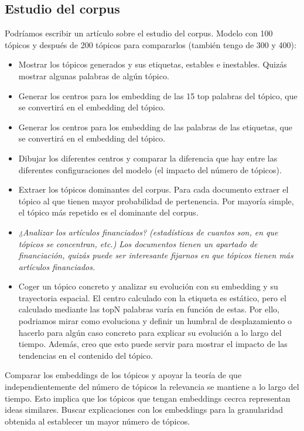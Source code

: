 \documentclass[a4paper,10pt]{article}
\begin{document}
\subsection{Estudio del corpus}
Podríamos escribir un artículo sobre el estudio del corpus. Modelo con 100 tópicos y después de 200 tópicos para compararlos (también tengo de 300 y 400):
\begin{itemize}
	\item Mostrar los tópicos generados y sus etiquetas, estables e inestables. Quizás mostrar algunas palabras de algún tópico. 
	\item Generar los centros para los embedding de las 15 top palabras del tópico, que se convertirá en el embedding del tópico.
	\item Generar los centros para los embedding de las palabras de las etiquetas, que se convertirá en el embedding del tópico.
	\item Dibujar los diferentes centros y comparar la diferencia que hay entre las diferentes configuraciones del modelo (el impacto del número de tópicos).
	\item Extraer los tópicos dominantes del corpus. Para cada documento extraer el tópico al que tienen mayor probabilidad de pertenencia. Por mayoría simple, el tópico más repetido es el dominante del corpus.
	\item \textit{¿Analizar los artículos financiados? (estadísticas de cuantos son, en que tópicos se concentran, etc.) Los documentos tienen un apartado de financiación, quizás puede ser interesante fijarnos en que tópicos tienen más artículos financiados.}
	\item Coger un tópico concreto y analizar su evolución con su embedding y su trayectoria espacial. El centro calculado con la etiqueta es estático, pero el calculado mediante las topN palabras varía en función de estas. Por ello, podriamos mirar como evoluciona y definir un humbral de desplazamiento o hacerlo para algún caso concreto para explicar su evolución a lo largo del tiempo. Además, creo que esto puede servir para mostrar el impacto de las tendencias en el contenido del tópico.
\end{itemize}

Comparar los embeddings de los tópicos y apoyar la teoría de que independientemente del número de tópicos la relevancia se mantiene a lo largo del tiempo. Esto implica que los tópicos que tengan embeddings cecrca representan ideas similares. Buscar explicaciones con los embeddings para la granularidad obtenida al establecer un mayor número de tópicos.
\end{document}
